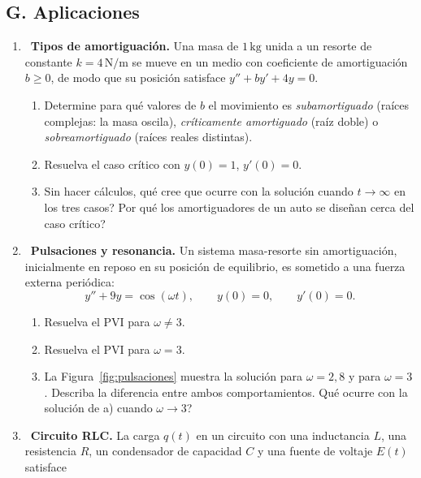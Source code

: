 \subsection*{G. Aplicaciones}

\begin{enumerate}[label=\textbf{G\arabic*.}, leftmargin=*]
    \item \medio\ \textbf{Tipos de amortiguaci\'on.} Una masa de $1\,\mathrm{kg}$ unida a un resorte de constante $k=4\,\mathrm{N/m}$ se mueve en un medio con coeficiente de amortiguaci\'on $b\geq0$, de modo que su posici\'on satisface $y''+by'+4y=0$.
    \begin{enumerate}[label=\alph*)]
        \item Determine para qu\'e valores de $b$ el movimiento es \emph{subamortiguado} (ra\'ices complejas: la masa oscila), \emph{cr\'iticamente amortiguado} (ra\'iz doble) o \emph{sobreamortiguado} (ra\'ices reales distintas).
        \item Resuelva el caso cr\'itico con $y(0)=1$, $y'(0)=0$.
        \item Sin hacer c\'alculos, \textquestiondown qu\'e cree que ocurre con la soluci\'on cuando $t\to\infty$ en los tres casos? \textquestiondown Por qu\'e los amortiguadores de un auto se dise\~nan cerca del caso cr\'itico?
    \end{enumerate}
    \item \medio\ \textbf{Pulsaciones y resonancia.} Un sistema masa-resorte sin amortiguaci\'on, inicialmente en reposo en su posici\'on de equilibrio, es sometido a una fuerza externa peri\'odica:
    \[
    y''+9y=\cos(\omega t),\qquad y(0)=0,\qquad y'(0)=0.
    \]
    \begin{enumerate}[label=\alph*)]
        \item Resuelva el PVI para $\omega\neq3$.
        \item Resuelva el PVI para $\omega=3$.
        \item La Figura~\ref{fig:pulsaciones} muestra la soluci\'on para $\omega=2{,}8$ y para $\omega=3$. Describa la diferencia entre ambos comportamientos. \textquestiondown Qu\'e ocurre con la soluci\'on de a) cuando $\omega\to3$?
    \end{enumerate}
    \item \medio\ \textbf{Circuito RLC.} La carga $q(t)$ en un circuito con una inductancia $L$, una resistencia $R$, un condensador de capacidad $C$ y una fuente de voltaje $E(t)$ satisface

\end{enumerate}
